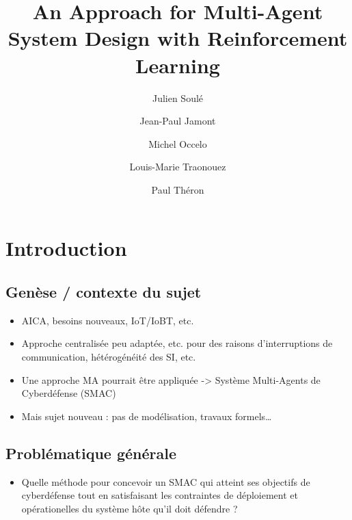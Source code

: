 \documentclass[runningheads]{llncs}
\begin{document}
%
\title{An Approach for Multi-Agent System Design with Reinforcement Learning}
%
%
\author{Julien Soulé \and
    Jean-Paul Jamont \and
    Michel Occelo \and
    Louis-Marie Traonouez \and
    Paul Théron}
%
%
%
\maketitle              %
%

\section{Introduction}

\subsection{Genèse / contexte du sujet}

\begin{itemize}
    \item AICA, besoins nouveaux, IoT/IoBT, etc.
    \item Approche centralisée peu adaptée, etc. pour des raisons d’interruptions de communication, hétérogénéité des SI, etc.
    \item Une approche MA pourrait être appliquée -> Système Multi-Agents de Cyberdéfense (SMAC)
    \item Mais sujet nouveau : pas de modélisation, travaux formels…
\end{itemize}

\subsection{Problématique générale}
\begin{itemize}

    \item Quelle méthode pour concevoir un SMAC qui atteint ses objectifs de cyberdéfense tout en satisfaisant les contraintes de déploiement et opérationelles du système hôte qu'il doit défendre ?
\end{itemize}
\end{document}

